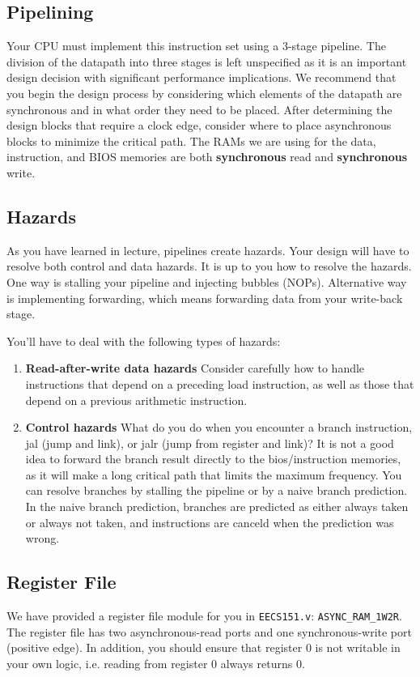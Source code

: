 


\subsection{Pipelining}
Your CPU must implement this instruction set using a 3-stage pipeline.
The division of the datapath into three stages is left unspecified as it is an important design decision with significant performance implications.
We recommend that you begin the design process by considering which elements of the datapath are synchronous and in what order they need to be placed.
After determining the design blocks that require a clock edge, consider where to place asynchronous blocks to minimize the critical path.
The RAMs we are using for the data, instruction, and BIOS memories are both \textbf{synchronous} read and \textbf{synchronous} write.


\subsection{Hazards}
As you have learned in lecture, pipelines create hazards.
Your design will have to resolve both control and data hazards.
It is up to you how to resolve the hazards.
One way is stalling your pipeline and injecting bubbles (NOPs).
Alternative way is implementing forwarding, which means forwarding data from your write-back stage.

You'll have to deal with the following types of hazards:
\begin{enumerate}
  \item \textbf{Read-after-write data hazards} Consider carefully how to handle instructions that depend on a preceding load instruction, as well as those that depend on a previous arithmetic instruction.
  \item \textbf{Control hazards} What do you do when you encounter a branch instruction, jal (jump and link), or jalr (jump from register and link)?
    It is not a good idea to forward the branch result directly to the bios/instruction memories,
    as it will make a long critical path that limits the maximum frequency.
    You can resolve branches by stalling the pipeline or by a naive branch prediction.
    In the naive branch prediction, branches are predicted as either always taken or always not taken, and instructions are canceld when the prediction was wrong.
\end{enumerate}


\subsection{Register File}
We have provided a register file module for you in \verb|EECS151.v|: \verb|ASYNC_RAM_1W2R|. The register file has two asynchronous-read ports and one synchronous-write port (positive edge). In addition, you should ensure that register 0 is not writable in your own logic, i.e. reading from register 0 always returns 0.



